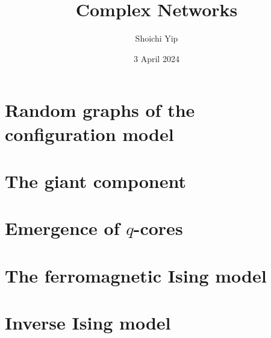 \documentclass[handout]{beamer}
\title{Complex Networks}
\author{Shoichi Yip}
\institute{M2 Physics of Complex Systems}
\date{3 April 2024}
\begin{document}
\frame{\titlepage}

\section{Random graphs of the configuration model}

\begin{frame}
\end{frame}

\section{The giant component}

\section{Emergence of $q$-cores}

\section{The ferromagnetic Ising model}

\section{Inverse Ising model}
\end{document}

